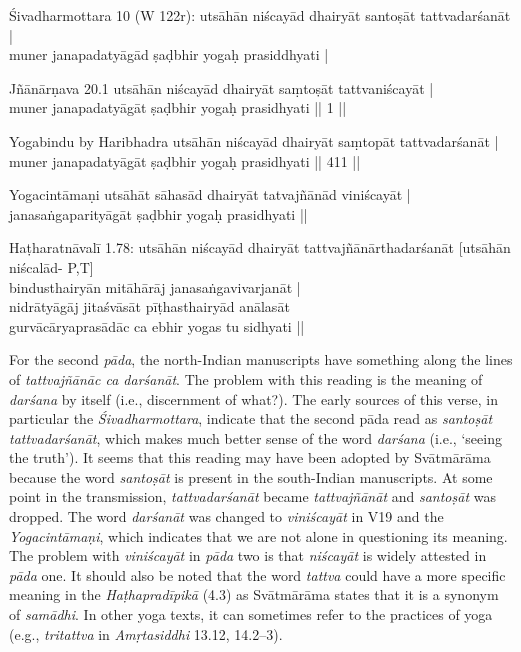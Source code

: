 \begin{ekdosis}
\begin{sources}[hp01_016]
Śivadharmottara 10 (W 122r):%
\startverse
utsāhān niścayād dhairyāt santoṣāt tattvadarśanāt |\\
muner janapadatyāgād ṣaḍbhir yogaḥ prasiddhyati |
\endverse

Jñānārṇava 20.1
\startverse
utsāhān niścayād dhairyāt saṃtoṣāt tattvaniścayāt |\\
muner janapadatyāgāt ṣaḍbhir yogaḥ prasidhyati || 1 ||
\endverse

Yogabindu by Haribhadra
\startverse
utsāhān niścayād dhairyāt saṃtopāt tattvadarśanāt |\\
muner janapadatyāgāt ṣaḍbhir yogaḥ prasidhyati || 411 ||
\endverse
\end{sources}

\begin{testimonia}[hp01_016]
Yogacintāmaṇi
\startverse
utsāhāt sāhasād dhairyāt tatvajñānād viniścayāt |\\
janasaṅgaparityāgāt ṣaḍbhir yogaḥ prasidhyati ||
\endverse

Haṭharatnāvalī 1.78:
\startverse
utsāhān niścayād dhairyāt tattvajñānārthadarśanāt
[utsāhān niścalād- P,T]\\
bindusthairyān mitāhārāj janasaṅgavivarjanāt |\\
nidrātyāgāj jitaśvāsāt pīṭhasthairyād anālasāt\\
gurvācāryaprasādāc ca ebhir yogas tu sidhyati || 
\endverse
\end{testimonia}

\begin{philcomm}[hp01_016]    
For the second \emph{pāda}, the north-Indian manuscripts have something along the lines of \emph{tattvajñānāc ca darśanāt}. The problem with this reading is the meaning of \emph{darśana} by itself (i.e., discernment of what?). The early sources of this verse, in particular the \emph{Śivadharmottara}, indicate that the second pāda read as \emph{santoṣāt tattvadarśanāt}, which makes much better sense of the word \emph{darśana} (i.e., ‘seeing the truth’). It seems that this reading may have been adopted by Svātmārāma because the word \emph{santoṣāt} is present in the south-Indian manuscripts. At some point in the transmission, \emph{tattvadarśanāt} became \emph{tattvajñānāt} and \emph{santoṣāt} was dropped. The word \emph{darśanāt} was changed to \emph{viniścayāt} in V19 and the \emph{Yogacintāmaṇi}, which indicates that we are not alone in questioning its meaning. The problem with \emph{viniścayāt} in \emph{pāda} two is that \emph{niścayāt} is widely attested in \emph{pāda} one. It should also be noted that the word \emph{tattva} could have a more specific meaning in the \emph{Haṭhapradīpikā} (4.3) as Svātmārāma states that it is a synonym of \emph{samādhi}. In other yoga texts, it can sometimes refer to the practices of yoga (e.g., \emph{tritattva} in \emph{Amṛtasiddhi} 13.12, 14.2--3). 
\end{philcomm}


\end{ekdosis}
